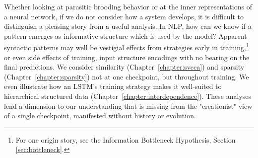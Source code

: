 Whether looking at parasitic brooding behavior or at the inner representations of a neural network, if we do not consider how a system develops, it is difficult to distinguish a pleasing story from a useful analysis. In NLP, how can we know if a pattern emerges as informative structure which is used by the model? Apparent syntactic patterns may well be vestigial effects from strategies early in training,\footnote{For one origin story, see the Information Bottleneck Hypothesis, Section \ref{sec:bottleneck}.} or even side effects of training, input structure encodings with no bearing on the final predictions. We consider similarity (Chapter~\ref{chapter:svcca}) and sparsity (Chapter~\ref{chapter:sparsity}) not at one checkpoint, but throughout training. We even illustrate how an LSTM's training strategy makes it well-suited to hierarchical structured data (Chapter~\ref{chapter:interdependence}). These analyses lend a dimension to our understanding that is missing from the "creationist" view of a single checkpoint, manifested without history or evolution.